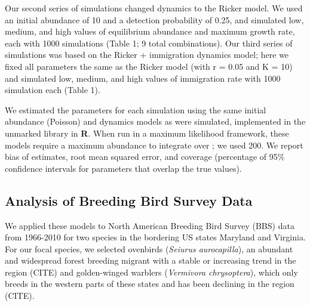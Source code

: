 \documentclass[12pt]{article}
\begin{document}
Our second series of simulations changed dynamics to the Ricker model.  
We used an initial abundance of 10 and a detection probability of 0.25, 
and simulated low, medium, and high values of equilibrium abundance 
and maximum growth rate, each with 1000 simulations (Table 1; 
9 total combinations).  Our third series of simulations was based on the 
Ricker + immigration dynamics model; here we fixed all parameters the 
same as the Ricker model (with r = 0.05 and K = 10) and simulated 
low, medium, and high values of immigration rate with 1000 simulation 
each (Table 1).

We estimated the parameters for each simulation using the same
initial abundance (Poisson) and dynamics models as were
simulated, implemented in the unmarked library in \textbf{R}.  When run
in a maximum likelihood framework, these models require a
maximum abundance to integrate over
\citep{royle:2004biom,dail_madsen:2011};
we used 200.  We report bias of estimates, root
mean squared error, and coverage (percentage of 95\% confidence
intervals for parameters that
overlap the true values).

\subsection{Analysis of Breeding Bird Survey Data}

We applied these models to North American Breeding Bird Survey (BBS)
data from 1966-2010 for two species in the bordering US states
Maryland and Virginia.  For our focal species, we selected ovenbirds
(\textit{Seiurus aurocapilla}), an abundant and widespread forest breeding
migrant with a stable or increasing trend in the region (CITE) and
golden-winged warblers (\textit{Vermivora chrysoptera}), which only breeds in
the western parts of these states and has been declining in the region
(CITE).  %
\end{document}
